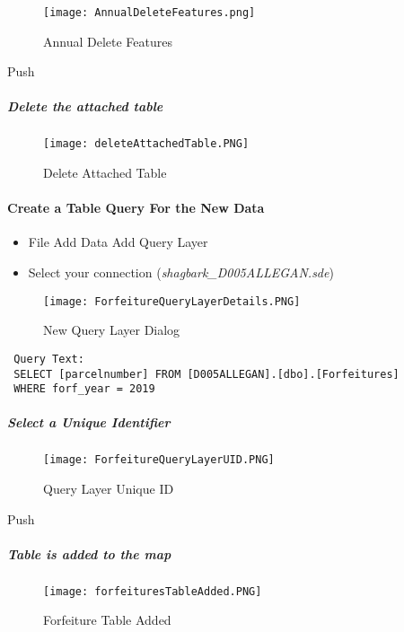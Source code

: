  \vspace{.1in}

 \begin{figure}[h!]
 \centering
     \texttt{[image: AnnualDeleteFeatures.png]}
 \caption{Annual Delete Features}
 \end{figure}
 \vspace{.15in}

{\bigbtn Push }


\subparagraph{Delete the attached table}
 \begin{figure}[h!]
 \centering
     \texttt{[image: deleteAttachedTable.PNG]}
 \caption{Delete Attached Table}
 \end{figure}



 \clearpage
 \paragraph{Create a Table Query For the New Data}

 \begin{itemize}
 \item {File {\menuArrow} Add Data {\menuArrow} Add Query Layer}
 \item {{ Select your connection} (\textit{shagbark\_D005ALLEGAN.sde})}
 \end{itemize}
 \begin{figure}[h!]
 \centering
     \texttt{[image: ForfeitureQueryLayerDetails.PNG]}
 \caption{New Query Layer Dialog}
 \end{figure}
 \begin{verbatim}
 Query Text:
 SELECT [parcelnumber] FROM [D005ALLEGAN].[dbo].[Forfeitures]
 WHERE forf_year = 2019
 \end{verbatim}
 \subparagraph{Select a Unique Identifier}
 \begin{figure}[h!]
 \centering
     \texttt{[image: ForfeitureQueryLayerUID.PNG]}
 \caption{Query Layer Unique ID}
 \end{figure}
{\bigbtn Push }

 \clearpage
 \subparagraph*{Table is added to the map}
 \begin{figure}[h!]
 \centering
     \texttt{[image: forfeituresTableAdded.PNG]}
 \caption{Forfeiture Table Added}
 \end{figure}
 \clearpage
